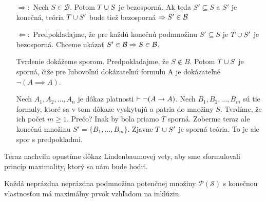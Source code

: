 \begin{dokaz}
   \begin{itemize}
       \item[$\Rightarrow:$]
            Nech $S \in \mathcal{B}$. Potom $T \cup S$ je bezosporná.
            Ak teda $S' \subseteq S$ a  $S'$ je konečná, teória 
            $T \cup S'$ bude tiež bezosporná $\Rightarrow S' \in \mathcal{B}$

        \item[$\Leftarrow:$]
            Predpokladajme, že pre každú konečnú podmnožinu $S' \subseteq S$
            je $T \cup S'$ je bezosporná.
            Chceme ukázať $S' \in \mathcal{B} \Rightarrow S \in \mathcal{B}$.

            Tvrdenie dokážeme sporom.
            Predpokladajme, že $S \not \in B$.
            Potom $T \cup S$ je sporná,
            čiže pre ľubovoľnú dokázateľnú formulu A je dokázateľné
            $\neg(A \implies A)$.

            Nech $A_1, A_2, \dots, A_n$ je dôkaz platnosti 
                $\vdash \neg(A \rightarrow A)$.
            Nech $B_1, B_2, \dots, B_m$ sú tie formuly,
            ktoré sa v tom dôkaze vyskytujú a patria do množiny $S$.
            Tvrdíme, že ich počet $m \ge 1$.
            Prečo? Inak by bola priamo $T$ sporná.
            Zoberme teraz ale konečnú množinu $S'=\{B_1, \dots, B_m\}$.
            Zjavne $T \cup S'$ je sporná teória.
            To je ale spor s predpokladmi.
    \end{itemize}

    Teraz nachvíľu opustíme dôkaz Lindenbaumovej vety, aby sme
    sformulovali princíp maximality, ktorý sa nám bude hodiť.
    \\
\end{dokaz}

\begin{lema}
    Každá neprázdna neprázdna podmnožina potenčnej množiny
    $\mathcal{P}(\mathscr{S})$ s konečnou vlastnosťou 
    má maximálny prvok vzhľadom na inklúziu.
\end{lema}

